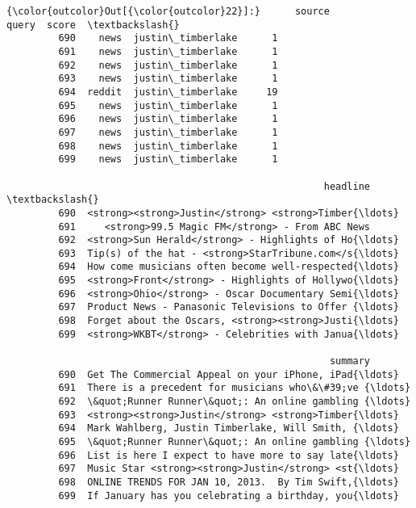 \documentclass[11pt]{article}
\begin{document}
\begin{Verbatim}[commandchars=\\\{\}]
{\color{outcolor}Out[{\color{outcolor}22}]:}      source              query  score  \textbackslash{}
         690    news  justin\_timberlake      1   
         691    news  justin\_timberlake      1   
         692    news  justin\_timberlake      1   
         693    news  justin\_timberlake      1   
         694  reddit  justin\_timberlake     19   
         695    news  justin\_timberlake      1   
         696    news  justin\_timberlake      1   
         697    news  justin\_timberlake      1   
         698    news  justin\_timberlake      1   
         699    news  justin\_timberlake      1   
         
                                                       headline  \textbackslash{}
         690  <strong><strong>Justin</strong> <strong>Timber{\ldots}   
         691     <strong>99.5 Magic FM</strong> - From ABC News   
         692  <strong>Sun Herald</strong> - Highlights of Ho{\ldots}   
         693  Tip(s) of the hat - <strong>StarTribune.com</s{\ldots}   
         694  How come musicians often become well-respected{\ldots}   
         695  <strong>Front</strong> - Highlights of Hollywo{\ldots}   
         696  <strong>Ohio</strong> - Oscar Documentary Semi{\ldots}   
         697  Product News - Panasonic Televisions to Offer {\ldots}   
         698  Forget about the Oscars, <strong><strong>Justi{\ldots}   
         699  <strong>WKBT</strong> - Celebrities with Janua{\ldots}   
         
                                                        summary  
         690  Get The Commercial Appeal on your iPhone, iPad{\ldots}  
         691  There is a precedent for musicians who\&\#39;ve {\ldots}  
         692  \&quot;Runner Runner\&quot;: An online gambling {\ldots}  
         693  <strong><strong>Justin</strong> <strong>Timber{\ldots}  
         694  Mark Wahlberg, Justin Timberlake, Will Smith, {\ldots}  
         695  \&quot;Runner Runner\&quot;: An online gambling {\ldots}  
         696  List is here I expect to have more to say late{\ldots}  
         697  Music Star <strong><strong>Justin</strong> <st{\ldots}  
         698  ONLINE TRENDS FOR JAN 10, 2013.  By Tim Swift,{\ldots}  
         699  If January has you celebrating a birthday, you{\ldots}  
\end{Verbatim}
            
\end{document}
